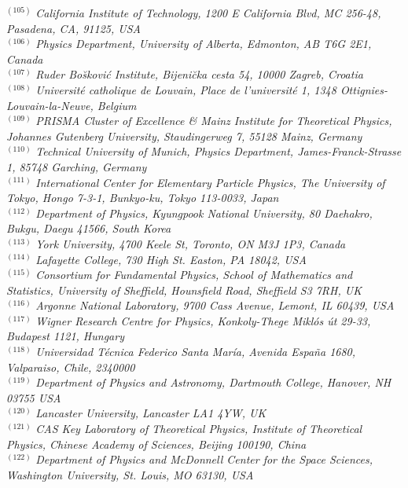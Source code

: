 {\begin{center}
$^{(105)}$ \emph{California Institute of Technology, 1200 E California Blvd, MC 256-48, Pasadena, CA, 91125, USA}\\
$^{(106)}$ \emph{Physics Department, University of Alberta, Edmonton,  AB T6G 2E1, Canada}\\
$^{(107)}$ \emph{Ruder Bo\u skovi\'c Institute, Bijeni\u cka cesta 54, 10000 Zagreb, Croatia}\\
$^{(108)}$ \emph{Universit\'e catholique de Louvain, Place de l'universit\'e 1, 1348 Ottignies-Louvain-la-Neuve, Belgium}\\
$^{(109)}$ \emph{PRISMA Cluster of Excellence \& Mainz Institute for Theoretical Physics, Johannes Gutenberg University, Staudingerweg 7,  55128 Mainz, Germany}\\
$^{(110)}$ \emph{Technical University of Munich, Physics Department, James-Franck-Strasse 1, 85748 Garching, Germany}\\
$^{(111)}$ \emph{International Center for Elementary Particle Physics, The University of Tokyo, Hongo 7-3-1, Bunkyo-ku, Tokyo 113-0033, Japan}\\
$^{(112)}$ \emph{Department of Physics, Kyungpook National University,  80 Daehakro, Bukgu, Daegu 41566, South Korea}\\
$^{(113)}$ \emph{York University, 4700 Keele St, Toronto, ON M3J 1P3, Canada }\\
$^{(114)}$ \emph{Lafayette College, 730 High St. Easton, PA 18042, USA}\\
$^{(115)}$ \emph{Consortium for Fundamental Physics, School of Mathematics and Statistics, University of Sheffield, Hounsfield Road, Sheffield S3 7RH, UK}\\
$^{(116)}$ \emph{Argonne National Laboratory, 9700 Cass Avenue, Lemont, IL 60439, USA}\\
$^{(117)}$ \emph{Wigner Research Centre for Physics, Konkoly-Thege Mikl\'os \'ut 29-33, Budapest 1121, Hungary}\\
$^{(118)}$ \emph{Universidad T\'ecnica Federico Santa Mar\'ia, Avenida Espa\~na 1680, Valparaiso, Chile, 2340000}\\
$^{(119)}$ \emph{Department of Physics and Astronomy, Dartmouth College, Hanover, NH 03755 USA}\\
$^{(120)}$ \emph{Lancaster University, Lancaster LA1 4YW, UK}\\
$^{(121)}$ \emph{CAS Key Laboratory of Theoretical Physics, Institute of Theoretical Physics, Chinese Academy of Sciences, Beijing 100190, China}\\
$^{(122)}$ \emph{Department of Physics and McDonnell Center for the Space Sciences, Washington University, St. Louis, MO 63130, USA}\\

\end{center}}